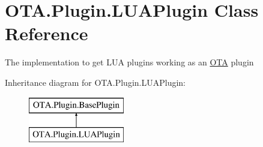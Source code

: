 \hypertarget{class_o_t_a_1_1_plugin_1_1_l_u_a_plugin}{}\section{O\+T\+A.\+Plugin.\+L\+U\+A\+Plugin Class Reference}
\label{class_o_t_a_1_1_plugin_1_1_l_u_a_plugin}


The implementation to get L\+U\+A plugins working as an \hyperlink{namespace_o_t_a}{O\+T\+A} plugin  


Inheritance diagram for O\+T\+A.\+Plugin.\+L\+U\+A\+Plugin\+:\begin{figure}[H]
\begin{center}
\leavevmode
\includegraphics[height=2.000000cm]{class_o_t_a_1_1_plugin_1_1_l_u_a_plugin}
\end{center}
\end{figure}
